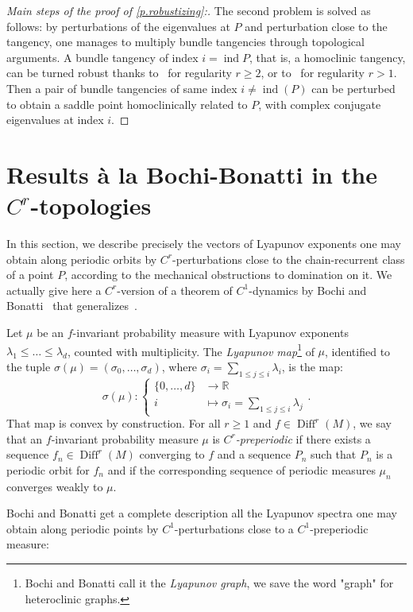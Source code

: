 \documentclass[11pt, a4paper]{amsart}
\theoremstyle{plain}
\theoremstyle{definition}
\theoremstyle{remark}
\numberwithin{equation}{section}         %
\DeclareMathOperator{\Diff}{{Diff}}
\DeclareMathOperator{\ind}{ind}
\def\Diff{\operatorname{Diff}}
\begin{document}
\begin{proof}[Main steps of the proof of \cref{p.robustizing}:]
The second problem is solved as follows: by perturbations of the eigenvalues at $P$ and perturbation close to the tangency, one manages to multiply bundle tangencies through  topological arguments. A bundle tangency of index $i=\ind P$, that is, a homoclinic tangency, can be turned robust thanks to~\cite{Ro} for regularity $r\geq 2$, or to~\cite{CG} for regularity $r>1$. Then a pair of bundle tangencies of same index $i\neq \ind(P)$ can be perturbed to obtain a saddle point homoclinically related to $P$, with complex conjugate eigenvalues at index $i$. 
\end{proof}


\section{Results \`a la Bochi-Bonatti in the $C^r$-topologies}\label{s.Lyapunov graphs}

In this section, we describe precisely the vectors of Lyapunov exponents one may obtain along periodic orbits by $C^r$-perturbations close to the chain-recurrent class of a point $P$, according to the mechanical obstructions to domination on it.
We actually give here a $C^r$-version of a theorem of $C^1$-dynamics by Bochi and Bonatti~\cite{BB} that generalizes~\cite{BDP}.

Let $\mu$ be an $f$-invariant probability measure with Lyapunov exponents $\lambda_1\leq \ldots \leq \lambda_d$, counted with multiplicity. The {\em Lyapunov map}\footnote{Bochi and Bonatti call it the {\em Lyapunov graph}, we save the word "graph" for heteroclinic graphs.} of $\mu$, identified to the tuple $\sigma(\mu)=(\sigma_0,\ldots,\sigma_d)$, where $\sigma_i=\sum_{1\leq j\leq i} \lambda_i$, is the map:
$$
\sigma(\mu)\colon \begin{cases}
\{0,\ldots,d\}&\to \mathbb{R}\\
i &\mapsto \sigma_i=\sum_{1\leq j\leq i} \lambda_j
\end{cases}.
$$
That map is convex by construction. For all $r\geq 1$ and $f\in \Diff^r(M)$, we say that an $f$-invariant probability measure $\mu$ is {\em $C^r$-preperiodic} if there exists a sequence $f_n\in \Diff^r(M)$ converging to $f$ and a sequence $P_n$ such that $P_n$ is a periodic orbit for $f_n$ and if the corresponding sequence of periodic measures $\mu_n$ converges weakly to $\mu$. 

Bochi and Bonatti get a complete description all the Lyapunov spectra one may obtain along periodic points by 
$C^1$-perturbations close to a $C^1$-preperiodic measure:
\medskip
\end{document}
